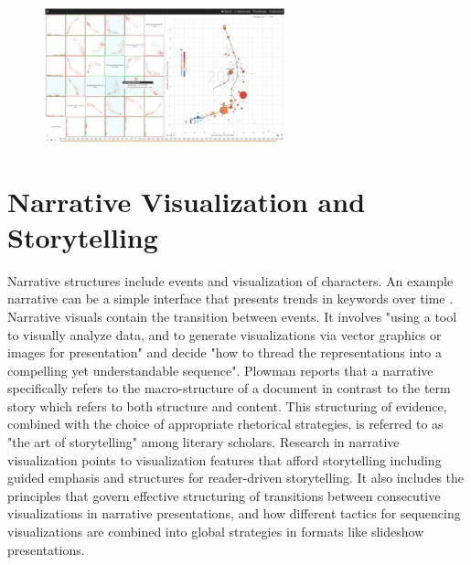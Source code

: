 \documentclass{egpubl}
\begin{document}
\begin{figure}
\begingroup
\centering
\includegraphics[width=7cm]{./images/lun2013}
\label{fig:lun2013}
\endgroup
\end{figure}

\section{Narrative Visualization and Storytelling}
Narrative structures include events and visualization of characters. An example narrative can be a simple interface that presents trends in keywords over time \cite{fisher}. Narrative visuals contain the transition between events. It involves "using a tool to visually analyze data, and to generate visualizations via vector graphics or images for presentation" and decide "how to thread the representations into a compelling yet understandable sequence"\cite{hullman2013deeper}. Plowman \cite{plowman1999,eccles2007} reports that a narrative specifically refers to the macro-structure of a document in contrast to the term story which refers to both structure and content. This structuring of evidence, combined with the choice of appropriate rhetorical strategies, is referred to as "the art of storytelling" among literary scholars. Research in narrative visualization points to visualization features that afford storytelling including guided emphasis and structures for reader-driven storytelling. It also includes the principles that govern effective structuring of transitions
between consecutive visualizations in narrative presentations, and how different tactics for sequencing visualizations are combined into global strategies in formats like slideshow presentations.
\end{document}
